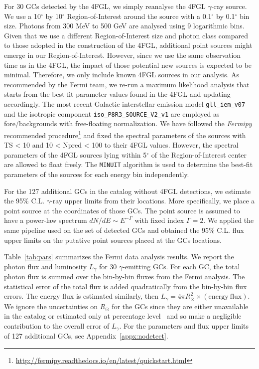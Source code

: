 \documentclass[doublespace,draft,nopageskip]{VTthesis} %
\begin{document}
For 30 GCs detected by the 4FGL, we simply reanalyse the 4FGL $\gamma$-ray source. We use a 10$^{\circ}$ by 10$^{\circ}$ Region-of-Interest around the source with a 0.1$^{\circ}$ by 0.1$^{\circ}$ bin size. Photons from 300 MeV to 500 GeV are analysed using 9 logarithmic bins. Given that we use a different Region-of-Interest size and photon class compared to those adopted in the construction of the 4FGL, additional point sources might emerge in our Region-of-Interest. However, since we use the same observation time as in the 4FGL, the impact of those potential new sources is expected to be minimal. Therefore, we only include known 4FGL sources in our analysis. As recommended by the Fermi team, we re-run a maximum likelihood analysis that starts from the best-fit parameter values found in the 4FGL and updating accordingly. The most recent Galactic interstellar emission model \texttt{gll\_iem\_v07} and the isotropic component \texttt{iso\_P8R3\_SOURCE\_V2\_v1} are employed as fore/backgrounds with free-floating normalization. We have followed the \textit{Fermipy} recommended procedure\footnote{\url{http://fermipy.readthedocs.io/en/latest/quickstart.html}} and fixed the spectral parameters of the sources with TS < 10 and 10 < Npred < 100 to their 4FGL values. However, the spectral parameters of the 4FGL sources lying within 5$^{\circ}$ of the Region-of-Interest center are allowed to float freely. The \texttt{MINUIT} algorithm is used to determine the best-fit parameters of the sources for each energy bin independently.

For the 127 additional GCs in the \citet{1996AJ....112.1487H} catalog without 4FGL detections, we estimate the 95\% C.L. $\gamma$-ray upper limits from their locations. More specifically, we place a point source at the coordinates of those GCs. The point source is assumed to have a power-law spectrum $dN/dE\sim E^{-\Gamma}$ with fixed index $\Gamma = 2$. We applied the same pipeline used on the set of detected GCs and obtained the 95\% C.L. flux upper limits on the putative point sources placed at the GCs locations.

Table~\ref{tab:pars} summarizes the Fermi data analysis results. We report the photon flux and luminosity $L_\gamma$ for 30 $\gamma$-emitting GCs. For each GC, the total photon flux is summed over the bin-by-bin fluxes from the Fermi analysis. The statistical error of the total flux is added quadratically from the bin-by-bin flux errors. The energy flux is estimated similarly, then $L_\gamma = 4\pi R_\odot^2 \times (\mathrm{energy\ flux})$. We ignore the uncertainties on $R_\odot$ for the GCs since they are either unavailable in the \citet{1996AJ....112.1487H} catalog or estimated only at percentage level~\citep{2017MNRAS.464.2174B} and so make a negligible contribution to the overall error of $L_\gamma$. For the parameters and flux upper limits of 127 additional GCs, see Appendix~\ref{appx:nodetect}.
\end{document}
